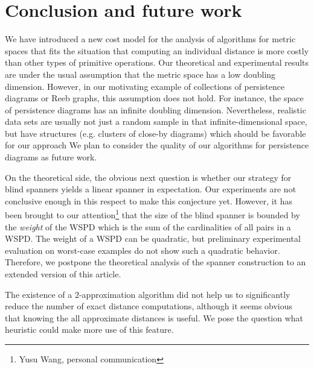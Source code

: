 \documentclass[a4paper,UKenglish,cleveref, autoref]{lipics-v2019}
\begin{document}


\section{Conclusion and future work}
\label{sec:conclusion}
%
We have introduced a new cost model for the analysis of algorithms
for metric spaces that fits the situation that computing an individual distance
is more costly than other types of primitive operations.
Our theoretical and experimental results are under the usual assumption
that the metric space has a low doubling dimension.
However, in our motivating example of collections of persistence diagrams
or Reeb graphs, this assumption does not hold. For instance,
the space of persistence diagrams has an infinite doubling dimension.
Nevertheless, realistic data sets are usually not just a random sample
in that infinite-dimensional space, but have structures
(e.g. clusters of close-by diagrams) which should be favorable for our approach
We plan to consider the quality of our algorithms for persistence diagrams
as future work.

On the theoretical side, the obvious next question is whether our strategy
for blind spanners yields a linear spanner in expectation. 
Our experiments are not conclusive enough in this respect to make this conjecture yet.
However, it has been brought to our attention\footnote{Yusu Wang, personal communication}
that the size of the blind spanner is bounded by the \emph{weight} of the WSPD
which is the sum of the  cardinalities of all pairs in a WSPD.
The weight of a WSPD can be quadratic, but preliminary
experimental evaluation on worst-case examples do not show such a quadratic
behavior. Therefore, we postpone the theoretical analysis of the spanner construction
to an extended version of this article.

The existence of a $2$-approximation algorithm did not help us to significantly
reduce the number of exact distance computations, although it seems obvious
that knowing the all approximate distances is useful.
We pose the question what heuristic could make more use of this feature.



\end{document}
